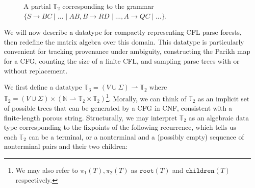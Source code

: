 \documentclass[runningheads]{llncs}
\begin{document}
  \begin{wrapfigure}{r}{0.47\textwidth}
    \vspace{-9pt}
    \caption{A partial $\mathbb{T}_2$ corresponding to the grammar $\{S \rightarrow BC \mid \ldots \mid AB, B\rightarrow RD \mid \ldots, A\rightarrow QC \mid \ldots\}$.}
    \label{fig:ptree}
    \vspace{-12pt}
  \end{wrapfigure}

  We will now describe a datatype for compactly representing CFL parse forests, then redefine the matrix algebra over this domain. This datatype is particularly convenient for tracking provenance under ambiguity, constructing the Parikh map for a CFG, counting the size of a finite CFL, and sampling parse trees with or without replacement.

  We first define a datatype $\mathbb{T}_3 = (V \cup \Sigma) \rightharpoonup \mathbb{T}_2$ where $\mathbb{T}_2 = (V \cup \Sigma) \times (\mathbb{N} \rightharpoonup \mathbb{T}_2\times\mathbb{T}_2)$\footnote{We may also refer to $\pi_1(T), \pi_2(T)$ as $\texttt{root}(T)$ and $\texttt{children}(T)$ respectively.}. Morally, we can think of $\mathbb{T}_2$ as an implicit set of possible trees that can be generated by a CFG in CNF, consistent with a finite-length porous string. Structurally, we may interpret $\mathbb{T}_2$ as an algebraic data type corresponding to the fixpoints of the following recurrence, which tells us each $\mathbb{T}_2$ can be a terminal, or a nonterminal and a (possibly empty) sequence of nonterminal pairs and their two children:\vspace{-10pt}
\end{document}
